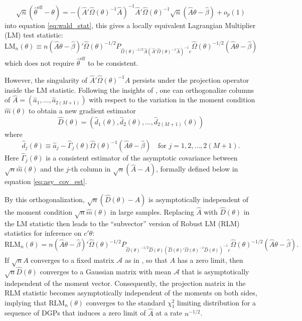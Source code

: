 \documentclass[11pt]{article}
\theoremstyle{definition}
\newcommand{\0}{\ensuremath{\mathbf{0}}}
\begin{document}
\begin{bibunit}
\[
	\sqrt{n}(\hat{\theta}^{\text{eff}} - \theta) = -(\hat{A}'\hat{\Omega}(\theta)^{-1}\hat{A})^{-1}\hat{A}'\hat{\Omega}(\theta)^{-1}\sqrt{n}(\hat{A}\theta - \hat{\beta}) + o_p(1)
\] 
into equation \eqref{eq:wald_stat}, this gives a locally equivalent Lagrangian Multiplier (LM) test statistic:
\[
	\text{LM}_n(\theta) \equiv n(\hat{A}\theta - \hat{\beta})'\hat{\Omega}(\theta)^{-1/2} P_{\hat{\Omega}(\theta)^{-1/2}\hat{A}(\hat{A}'\hat{\Omega}(\theta)^{-1}\hat{A})^{-1}c}\hat{\Omega}(\theta)^{-1/2}(\hat{A}\theta - \hat{\beta})
\]
which does not require $\hat{\theta}^{\text{eff}}$ to be consistent.

However, the singularity of $\hat{A}'\hat{\Omega}(\theta)^{-1}\hat{A}$ persists under the projection operator inside the LM statistic.  Following the insights of \cite{kleibergen:2005}, one can orthogonalize columns of $\hat{A} = (\hat{a}_1,\ldots, \hat{a}_{2(M+1)})$ with respect to the variation in the moment condition $\hat{m}(\theta)$ to obtain a new gradient estimator 
\[
	\hat{D}(\theta) = (\hat{d}_1(\theta), \hat{d}_2(\theta), \ldots, \hat{d}_{2(M+1)}(\theta))
\]
where 
\[
	\hat{d}_j(\theta) \equiv \hat{a}_j - \hat{\Gamma}_j(\theta)\hat{\Omega}(\theta)^{-1}(\hat{A}\theta - \hat{\beta}) \quad \text{for } j = 1,2,\ldots, 2(M+1).
\]
Here $\hat{\Gamma}_j(\theta)$ is a consistent estimator of the asymptotic covariance between $\sqrt{n}\hat{m}(\theta)$ and the $j$-th column in $\sqrt{n}(\hat{A} - A)$, formally defined below in equation \eqref{eq:asy_cov_est}. 

By this orthogonalization, $\sqrt{n}(\hat{D}(\theta) - A)$ is asymptotically independent of the moment condition $\sqrt{n}\hat{m}(\theta)$ in large samples. Replacing $\hat{A}$ with $\hat{D}(\theta)$ in the LM statistic then leads to the ``subvector'' version of Robust LM (RLM) statistics for inference on $c'\theta$:
\begin{equation}
\label{eq:KLM}
	\text{RLM}_n(\theta) 
        =  n(\hat{A}\theta - \hat{\beta})'\hat{\Omega}(\theta)^{-1/2} P_{\hat{\Omega}(\theta)^{-1/2}\hat{D}(\theta)(\hat{D}(\theta)'\hat{\Omega}(\theta)^{-1}\hat{D}(\theta))^{-1}c}\hat{\Omega}(\theta)^{-1/2}(\hat{A}\theta - \hat{\beta}).
\end{equation}
If $\sqrt{n}A$ converges to a fixed matrix $\mathcal{A}$ as in \citet[page 1108]{kleibergen:2005}, so that $A$ has a zero limit, then $\sqrt{n}\hat{D}(\theta)$ converges to a Gaussian matrix with mean $\mathcal{A}$ that is asymptotically independent of the moment vector. Consequently, the projection matrix in the RLM statistic becomes asymptotically independent of the moments on both sides, implying that $\text{RLM}_n(\theta)$ converges to the standard $\chi_1^2$ limiting distribution for a sequence of DGPs that induces a zero limit of $\hat{A}$ at a rate $n^{-1/2}$.



\end{bibunit}
\end{document}
